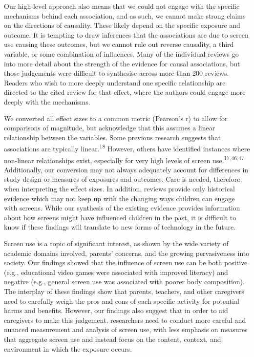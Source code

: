 \documentclass[
  english,
  man]{apa6}
\begin{document}
Our high-level approach also means that we could not engage with the specific mechanisms behind each association, and as such, we cannot make strong claims on the directions of causality.
These likely depend on the specific exposure and outcome.
It is tempting to draw inferences that the associations are due to screen use causing these outcomes, but we cannot rule out reverse causality, a third variable, or some combination of influences.
Many of the individual reviews go into more detail about the strength of the evidence for causal associations, but those judgements were difficult to synthesise across more than 200 reviews.
Readers who wish to more deeply understand one specific relationship are directed to the cited review for that effect, where the authors could engage more deeply with the mechanisms.

We converted all effect sizes to a common metric (Pearson's r) to allow for comparisons of magnitude, but acknowledge that this assumes a linear relationship between the variables.
Some previous research suggests that associations are typically linear.\textsuperscript{18}
However, others have identified instances where non-linear relationships exist, especially for very high levels of screen use.\textsuperscript{17,46,47}
Additionally, our conversion may not always adequately account for differences in study design or measures of exposures and outcomes.
Care is needed, therefore, when interpreting the effect sizes.
In addition, reviews provide only historical evidence which may not keep up with the changing ways children can engage with screens.
While our synthesis of the existing evidence provides information about how screens might have influenced children in the past, it is difficult to know if these findings will translate to new forms of technology in the future.

Screen use is a topic of significant interest, as shown by the wide variety of academic domains involved, parents' concerns, and the growing pervasiveness into society.
Our findings showed that the influence of screen use can be both positive (e.g., educational video games were associated with improved literacy) and negative (e.g., general screen use was associated with poorer body composition).
The interplay of these findings show that parents, teachers, and other caregivers need to carefully weigh the pros and cons of each specific activity for potential harms and benefits.
However, our findings also suggest that in order to aid caregivers to make this judgement, researchers need to conduct more careful and nuanced measurement and analysis of screen use, with less emphasis on measures that aggregate screen use and instead focus on the content, context, and environment in which the exposure occurs.
\end{document}
